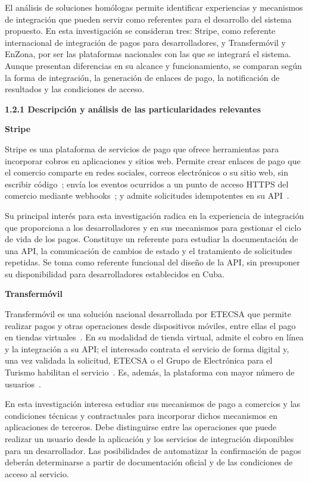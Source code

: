 \documentclass[12pt]{article}
\newcommand\vacio{\leavevmode\par}
\begin{document}
El análisis de soluciones homólogas permite identificar experiencias y mecanismos de integración que pueden servir como referentes para el desarrollo del sistema propuesto. En esta investigación se consideran tres: Stripe, como referente internacional de integración de pagos para desarrolladores, y Transfermóvil y EnZona, por ser las plataformas nacionales con las que se integrará el sistema. Aunque presentan diferencias en su alcance y funcionamiento, se comparan según la forma de integración, la generación de enlaces de pago, la notificación de resultados y las condiciones de acceso.

\vacio
\textbf{1.2.1 Descripción y análisis de las particularidades relevantes}

\textbf{Stripe}

Stripe es una plataforma de servicios de pago que ofrece herramientas para incorporar cobros en aplicaciones y sitios web. Permite crear enlaces de pago que el comercio comparte en redes sociales, correos electrónicos o su sitio web, sin escribir código~\cite{stripelinks}; envía los eventos ocurridos a un punto de acceso HTTPS del comercio mediante webhooks~\cite{stripeweb}; y admite solicitudes idempotentes en su API~\cite{stripeidem}.

Su principal interés para esta investigación radica en la experiencia de integración que proporciona a los desarrolladores y en sus mecanismos para gestionar el ciclo de vida de los pagos. Constituye un referente para estudiar la documentación de una API, la comunicación de cambios de estado y el tratamiento de solicitudes repetidas. Se toma como referente funcional del diseño de la API, sin presuponer su disponibilidad para desarrolladores establecidos en Cuba.

\vacio
\textbf{Transfermóvil}

Transfermóvil es una solución nacional desarrollada por ETECSA que permite realizar pagos y otras operaciones desde dispositivos móviles, entre ellas el pago en tiendas virtuales~\cite{etecsat}. En su modalidad de tienda virtual, admite el cobro en línea y la integración a su API; el interesado contrata el servicio de forma digital y, una vez validada la solicitud, ETECSA o el Grupo de Electrónica para el Turismo habilitan el servicio~\cite{oncuba23}. Es, además, la plataforma con mayor número de usuarios~\cite{etecsa,mesa23b}.

En esta investigación interesa estudiar sus mecanismos de pago a comercios y las condiciones técnicas y contractuales para incorporar dichos mecanismos en aplicaciones de terceros. Debe distinguirse entre las operaciones que puede realizar un usuario desde la aplicación y los servicios de integración disponibles para un desarrollador. Las posibilidades de automatizar la confirmación de pagos deberán determinarse a partir de documentación oficial y de las condiciones de acceso al servicio.
\end{document}
